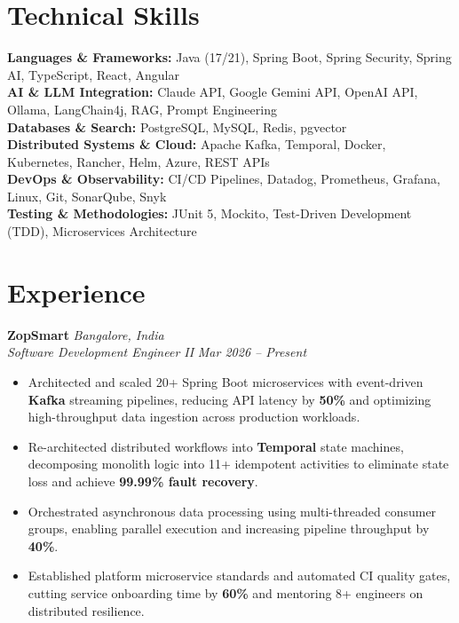\documentclass[a4paper,10pt]{article}
\begin{document}
\section{Technical Skills}
\begin{itemize}[leftmargin=0.15in, label={}]
  \small{\item{
    \textbf{Languages \& Frameworks:}{ Java (17/21), Spring Boot, Spring Security, Spring AI, TypeScript, React, Angular} \\ \vspace{1pt}
    \textbf{AI \& LLM Integration:}{ Claude API, Google Gemini API, OpenAI API, Ollama, LangChain4j, RAG, Prompt Engineering} \\ \vspace{1pt}
    \textbf{Databases \& Search:}{ PostgreSQL, MySQL, Redis, pgvector} \\ \vspace{1pt}
    \textbf{Distributed Systems \& Cloud:}{ Apache Kafka, Temporal, Docker, Kubernetes, Rancher, Helm, Azure, REST APIs} \\ \vspace{1pt}
    \textbf{DevOps \& Observability:}{ CI/CD Pipelines, Datadog, Prometheus, Grafana, Linux, Git, SonarQube, Snyk} \\ \vspace{1pt}
    \textbf{Testing \& Methodologies:}{ JUnit 5, Mockito, Test-Driven Development (TDD), Microservices Architecture}
  }}
\end{itemize}
\vspace{-6pt}

\section{Experience}

\vspace{1pt}
\textbf{ZopSmart} \hfill \textit{Bangalore, India} \\
\textit{Software Development Engineer II} \hfill \textit{Mar 2026 – Present}
\begin{itemize}[label={\textbullet}, itemsep=0.02em, leftmargin=*]
\item Architected and scaled 20+ Spring Boot microservices with event-driven \textbf{Kafka} streaming pipelines, reducing API latency by \textbf{50\%} and optimizing high-throughput data ingestion across production workloads.
\item Re-architected distributed workflows into \textbf{Temporal} state machines, decomposing monolith logic into 11+ idempotent activities to eliminate state loss and achieve \textbf{99.99\% fault recovery}.
\item Orchestrated asynchronous data processing using multi-threaded consumer groups, enabling parallel execution and increasing pipeline throughput by \textbf{40\%}.
\item Established platform microservice standards and automated CI quality gates, cutting service onboarding time by \textbf{60\%} and mentoring 8+ engineers on distributed resilience.
\end{itemize}
\end{document}
